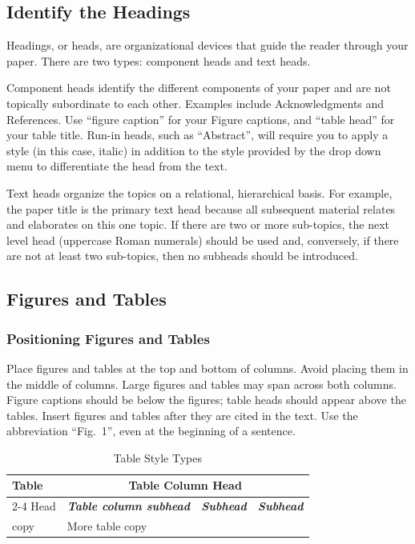 \documentclass[conference,pbalance]{iaria}
\begin{document}
\subsection{Identify the Headings}
Headings, or heads, are organizational devices that guide the reader through your paper. There are two types: component heads and text heads.

Component heads identify the different components of your paper and are not topically subordinate to each other. Examples include Acknowledgments and References. %
Use “figure caption” for your Figure captions, and “table head” for your table title. Run-in heads, such as “Abstract”, will require you to apply a style (in this case, italic) in addition to the style provided by the drop down menu to differentiate the head from the text.

Text heads organize the topics on a relational, hierarchical basis. For example, the paper title is the primary text head because all subsequent material relates and elaborates on this one topic. If there are two or more sub-topics, the next level head (uppercase Roman numerals) should be used and, conversely, if there are not at least two sub-topics, then no subheads should be introduced.

\subsection{Figures and Tables}

\subsubsection{Positioning Figures and Tables}
Place figures and tables at the top and bottom of columns. Avoid placing them in the middle of columns. Large figures and tables may span across both columns. Figure captions should be below the figures; table heads should appear above the tables. Insert figures and tables after they are cited in the text. Use the abbreviation “Fig.~1”, even at the beginning of a sentence.

\begin{table}[htbp]
\caption{Table Style Types}
\renewcommand{\arraystretch}{1.5} %
\begin{tabular}{|l|l|l|l|}
\hline
Table & \multicolumn{3}{c|}{\textbf{Table Column Head}} \\ \cline{2-4}
Head & \textbf{\emph{Table column subhead}}  & \textbf{\emph{Subhead}} & \textbf{\emph{Subhead}} \\ \hline
copy & More table copy & ~ & ~ \\ \hline
\end{tabular}
\end{table}
\end{document}
